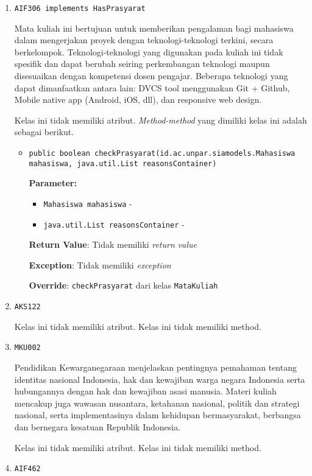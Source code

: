 \documentclass{article}
\begin{document}
\begin{enumerate}
\begin{itemize}
\end{itemize}
\item \texttt{AIF306 implements HasPrasyarat}

Mata kuliah ini bertujuan untuk memberikan pengalaman bagi mahasiswa dalam
 mengerjakan proyek dengan teknologi-teknologi terkini, secara berkelompok.
 Teknologi-teknologi yang digunakan pada kuliah ini tidak spesifik dan dapat
 berubah seiring perkembangan teknologi maupun disesuaikan dengan kompetensi
 dosen pengajar. Beberapa teknologi yang dapat dimanfaatkan antara lain: DVCS
 tool menggunakan Git + Github, Mobile native app (Android, iOS, dll), dan
 responsive web design.

Kelas ini tidak memiliki atribut. \textit{Method-method} yang dimiliki kelas ini adalah sebagai berikut.
\begin{itemize}
\item \texttt{public boolean checkPrasyarat(id.ac.unpar.siamodels.Mahasiswa mahasiswa, java.util.List reasonsContainer)}

\textbf{Parameter:}
\begin{itemize}
\item \texttt{Mahasiswa mahasiswa} - 
\item \texttt{java.util.List reasonsContainer} - 
\end{itemize}
\textbf{Return Value}: Tidak memiliki \textit{return value}

\textbf{Exception}: Tidak memiliki \textit{exception}

\textbf{Override}: \texttt{checkPrasyarat} dari kelas \texttt{MataKuliah}

\end{itemize}
\item \texttt{AKS122}



Kelas ini tidak memiliki atribut. Kelas ini tidak memiliki method. \item \texttt{MKU002}

Pendidikan Kewarganegaraan menjelaskan pentingnya pemahaman tentang identitas nasional 
 Indonesia, hak dan kewajiban warga negara Indonesia serta hubungannya dengan hak dan 
 kewajiban asasi manusia. Materi kuliah mencakup juga wawasan nusantara, ketahanan nasional, 
 politik dan strategi nasional, serta implementasinya dalam kehidupan bermasyarakat, berbangsa 
 dan bernegara kesatuan Republik Indonesia.

Kelas ini tidak memiliki atribut. Kelas ini tidak memiliki method. \item \texttt{AIF462}




\end{enumerate}
\end{document}
